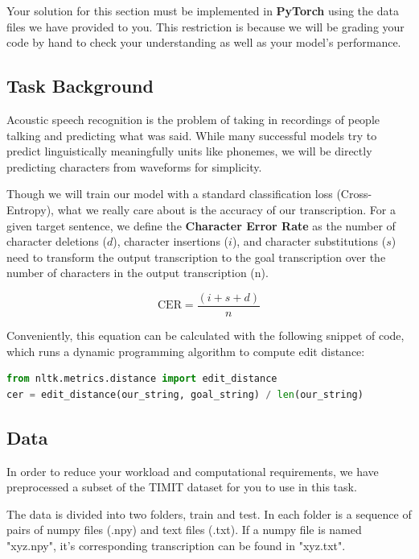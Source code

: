 \documentclass[11pt,addpoints,answers]{exam}
\numberwithin{equation}{section} %
\numberwithin{figure}{section} %
\numberwithin{table}{section} %
\begin{document}
Your solution for this section must be implemented in \textbf{PyTorch} using the data files we have provided to you. This restriction is because we will be grading your code by hand to check your understanding as well as your model's performance. 

\subsection{Task Background}

Acoustic speech recognition is the problem of taking in recordings of people talking and predicting what was said. While many successful models try to predict linguistically meaningfully units like phonemes, we will be directly predicting characters from waveforms for simplicity. 

Though we will train our model with a standard classification loss (Cross-Entropy), what we really care about is the accuracy of our transcription. For a given target sentence, we define the \textbf{Character Error Rate} as the number of character deletions ($d$), character insertions ($i$), and character substitutions ($s$) need to transform the output transcription to the goal transcription over the number of characters in the output transcription (n).

\begin{equation}
    \text{CER} = \frac{(i + s + d)}{n}
\end{equation}

Conveniently, this equation can be calculated with the following snippet of code, which runs a dynamic programming algorithm to compute edit distance:

\medskip

\begin{lstlisting}[language=Python]
from nltk.metrics.distance import edit_distance
cer = edit_distance(our_string, goal_string) / len(our_string)

\end{lstlisting}

\subsection{Data}

In order to reduce your workload and computational requirements, we have preprocessed a subset of the TIMIT dataset for you to use in this task. 

The data is divided into two folders, train and test. In each folder is a sequence of pairs of numpy files (.npy) and text files (.txt). If a numpy file is named "xyz.npy", it's corresponding transcription can be found in "xyz.txt". 
\end{document}
